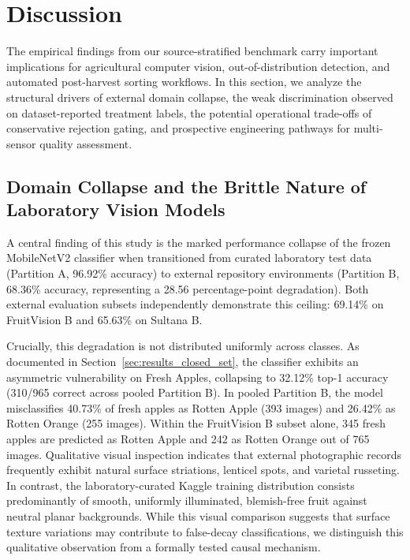 \section{Discussion}
\label{sec:discussion}

The empirical findings from our source-stratified benchmark carry important implications for agricultural computer vision, out-of-distribution detection, and automated post-harvest sorting workflows. In this section, we analyze the structural drivers of external domain collapse, the weak discrimination observed on dataset-reported treatment labels, the potential operational trade-offs of conservative rejection gating, and prospective engineering pathways for multi-sensor quality assessment.

\vspace*{-7pt}\subsection{Domain Collapse and the Brittle Nature of Laboratory Vision Models}
\vspace*{-2pt}
\label{sec:discussion_domain_collapse}

A central finding of this study is the marked performance collapse of the frozen MobileNetV2 classifier when transitioned from curated laboratory test data (Partition A, 96.92\% accuracy) to external repository environments (Partition B, 68.36\% accuracy, representing a 28.56 percentage-point degradation). Both external evaluation subsets independently demonstrate this ceiling: 69.14\% on FruitVision B and 65.63\% on Sultana B.

Crucially, this degradation is not distributed uniformly across classes. As documented in Section~\ref{sec:results_closed_set}, the classifier exhibits an asymmetric vulnerability on Fresh Apples, collapsing to 32.12\% top-1 accuracy (310/965 correct across pooled Partition B). In pooled Partition B, the model misclassifies 40.73\% of fresh apples as Rotten Apple (393 images) and 26.42\% as Rotten Orange (255 images). Within the FruitVision B subset alone, 345 fresh apples are predicted as Rotten Apple and 242 as Rotten Orange out of 765 images. Qualitative visual inspection indicates that external photographic records frequently exhibit natural surface striations, lenticel spots, and varietal russeting. In contrast, the laboratory-curated Kaggle training distribution consists predominantly of smooth, uniformly illuminated, blemish-free fruit against neutral planar backgrounds. While this visual comparison suggests that surface texture variations may contribute to false-decay classifications, we distinguish this qualitative observation from a formally tested causal mechanism.

